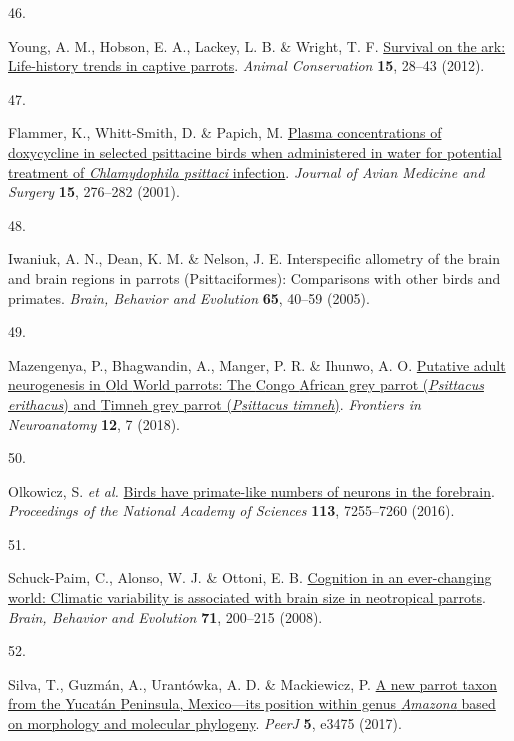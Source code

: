 \documentclass[
  man,floatsintext]{apa6}
\newlength{\cslhangindent}
\newlength{\csllabelwidth}
\newlength{\cslentryspacingunit} %
\newenvironment{CSLReferences}[2] %
 {%
  \setlength{\parindent}{0pt}
  \ifodd #1
  \let\oldpar\par
  \def\par{\hangindent=\cslhangindent\oldpar}
  \fi
  \setlength{\parskip}{#2\cslentryspacingunit}
 }%
 {}
\newcommand{\CSLLeftMargin}[1]{\parbox[t]{\csllabelwidth}{#1}}
\newcommand{\CSLRightInline}[1]{\parbox[t]{\linewidth - \csllabelwidth}{#1}\break}
\begin{document}
\begin{CSLReferences}{0}{0}
\leavevmode{}%
\CSLLeftMargin{46. }%
\CSLRightInline{Young, A. M., Hobson, E. A., Lackey, L. B. \& Wright, T. F. \href{https://doi.org/10.1111/j.1469-1795.2011.00477.x}{Survival on the ark: Life-history trends in captive parrots}. \emph{Animal Conservation} \textbf{15}, 28--43 (2012).}

\leavevmode{}%
\CSLLeftMargin{47. }%
\CSLRightInline{Flammer, K., Whitt-Smith, D. \& Papich, M. \href{https://doi.org/10.1647/1082-6742(2001)015\%5B0276:PCODIS\%5D2.0.CO;2}{Plasma concentrations of doxycycline in selected psittacine birds when administered in water for potential treatment of \emph{{C}hlamydophila psittaci} infection}. \emph{Journal of Avian Medicine and Surgery} \textbf{15}, 276--282 (2001).}

\leavevmode{}%
\CSLLeftMargin{48. }%
\CSLRightInline{Iwaniuk, A. N., Dean, K. M. \& Nelson, J. E. Interspecific allometry of the brain and brain regions in parrots ({P}sittaciformes): Comparisons with other birds and primates. \emph{Brain, Behavior and Evolution} \textbf{65}, 40--59 (2005).}

\leavevmode{}%
\CSLLeftMargin{49. }%
\CSLRightInline{Mazengenya, P., Bhagwandin, A., Manger, P. R. \& Ihunwo, A. O. \href{https://doi.org/10.3389/fnana.2018.00007}{Putative adult neurogenesis in {O}ld {W}orld parrots: The {C}ongo {A}frican grey parrot (\emph{{P}sittacus erithacus}) and {T}imneh grey parrot (\emph{{P}sittacus timneh})}. \emph{Frontiers in Neuroanatomy} \textbf{12}, 7 (2018).}

\leavevmode{}%
\CSLLeftMargin{50. }%
\CSLRightInline{Olkowicz, S. \emph{et al.} \href{https://doi.org/10.1073/pnas.1517131113}{Birds have primate-like numbers of neurons in the forebrain}. \emph{Proceedings of the National Academy of Sciences} \textbf{113}, 7255--7260 (2016).}

\leavevmode{}%
\CSLLeftMargin{51. }%
\CSLRightInline{Schuck-Paim, C., Alonso, W. J. \& Ottoni, E. B. \href{https://doi.org/10.1159/000119710}{Cognition in an ever-changing world: Climatic variability is associated with brain size in neotropical parrots}. \emph{Brain, Behavior and Evolution} \textbf{71}, 200--215 (2008).}

\leavevmode{}%
\CSLLeftMargin{52. }%
\CSLRightInline{Silva, T., Guzmán, A., Urantówka, A. D. \& Mackiewicz, P. \href{https://doi.org/10.7717/peerj.3475}{A new parrot taxon from the {Y}ucat{á}n {P}eninsula, {M}exico---its position within genus \emph{{A}mazona} based on morphology and molecular phylogeny}. \emph{PeerJ} \textbf{5}, e3475 (2017).}


\end{CSLReferences}
\end{document}
